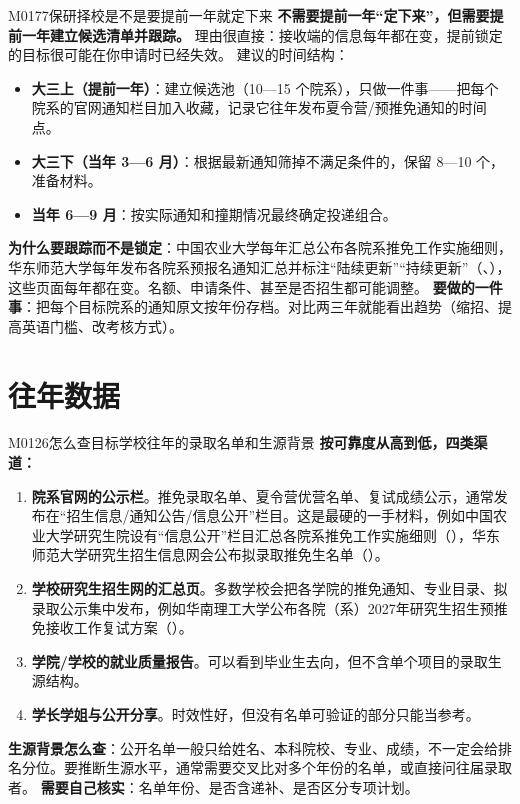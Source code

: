 \begin{qa}{M0177}{保研择校是不是要提前一年就定下来}
\textbf{不需要提前一年“定下来”，但需要提前一年建立候选清单并跟踪。} 理由很直接：接收端的信息每年都在变，提前锁定的目标很可能在你申请时已经失效。
建议的时间结构：
\begin{itemize}
  \item \textbf{大三上（提前一年）}：建立候选池（10—15 个院系），只做一件事——把每个院系的官网通知栏目加入收藏，记录它往年发布夏令营/预推免通知的时间点。
  \item \textbf{大三下（当年 3—6 月）}：根据最新通知筛掉不满足条件的，保留 8—10 个，准备材料。
  \item \textbf{当年 6—9 月}：按实际通知和撞期情况最终确定投递组合。
\end{itemize}
\textbf{为什么要跟踪而不是锁定}：中国农业大学每年汇总公布各院系推免工作实施细则，华东师范大学每年发布各院系预报名通知汇总并标注“陆续更新”“持续更新”（、），这些页面每年都在变。名额、申请条件、甚至是否招生都可能调整。
\textbf{要做的一件事}：把每个目标院系的通知原文按年份存档。对比两三年就能看出趋势（缩招、提高英语门槛、改考核方式）。
\end{qa}

\section{往年数据}
\begin{qa}{M0126}{怎么查目标学校往年的录取名单和生源背景}
\textbf{按可靠度从高到低，四类渠道：}
\begin{enumerate}
  \item \textbf{院系官网的公示栏}。推免录取名单、夏令营优营名单、复试成绩公示，通常发布在“招生信息/通知公告/信息公开”栏目。这是最硬的一手材料，例如中国农业大学研究生院设有“信息公开”栏目汇总各院系推免工作实施细则（），华东师范大学研究生招生信息网会公布拟录取推免生名单（）。
  \item \textbf{学校研究生招生网的汇总页}。多数学校会把各学院的推免通知、专业目录、拟录取公示集中发布，例如华南理工大学公布各院（系）2027年研究生招生预推免接收工作复试方案（）。
  \item \textbf{学院/学校的就业质量报告}。可以看到毕业生去向，但不含单个项目的录取生源结构。
  \item \textbf{学长学姐与公开分享}。时效性好，但没有名单可验证的部分只能当参考。
\end{enumerate}
\textbf{生源背景怎么查}：公开名单一般只给姓名、本科院校、专业、成绩，不一定会给排名分位。要推断生源水平，通常需要交叉比对多个年份的名单，或直接问往届录取者。
\textbf{需要自己核实}：名单年份、是否含递补、是否区分专项计划。
\end{qa}

